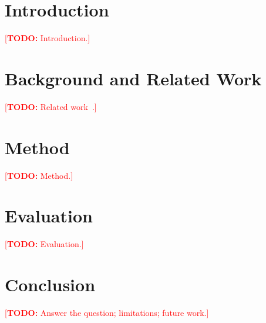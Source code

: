 \documentclass[11pt,a4paper]{article}
\title{\todo{Title}}
\author{Author Name\\ \small Affiliation \\ \small\texttt{email@example.org}}
\date{\today}
\newcommand{\todo}[1]{\textcolor{red}{[\textbf{TODO:} #1]}}
\begin{document}
\maketitle

\begin{abstract}
\todo{Abstract, 150--250 words.}
\end{abstract}

\section{Introduction}\label{sec:intro}
\todo{Introduction.}

\section{Background and Related Work}\label{sec:related}
\todo{Related work~\cite{lamport1994latex}.}

\section{Method}\label{sec:method}
\todo{Method.}

\section{Evaluation}\label{sec:evaluation}
\todo{Evaluation.}

\section{Conclusion}\label{sec:conclusion}
\todo{Answer the question; limitations; future work.}



\end{document}
